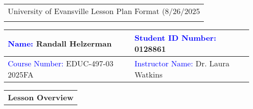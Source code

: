 \begin{tabularx}{\textwidth}{Y}
  {\large University of Evansville Lesson Plan Format (8/26/2025} \\
   \hline \\
\end{tabularx}


\begin{tabularx}{\textwidth}{|X|X|}
  \hline 
  \textcolor{blue}{Name:} Randall Helzerman           &   \textcolor{blue}{Student ID Number:} 0128861 \\
  \hline 
  \textcolor{blue}{Course Number:} EDUC-497-03 2025FA &   \textcolor{blue}{Instructor Name:} Dr. Laura Watkins\\
  \hline 
\end{tabularx}

\vskip 10pt

\begin{tabularx}{\textwidth}{Y}
  {\bf Lesson Overview} \\
\end{tabularx}


